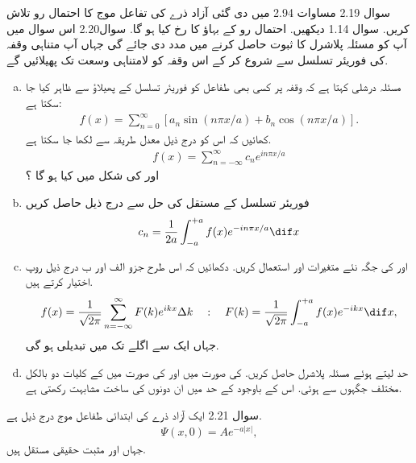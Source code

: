 سوال 2.19
مساوات 2.94 میں دی گئی آزاد ذرے کی تفاعل موج کا احتمال رو  تلاش کریں. سوال 1.14 دیکھیں. احتمال رو کے بہاؤ کا رخ کیا ہو گا. 
سوال2.20
اس سوال میں آپ کو مسئلہ پلاشرل کا ثبوت حاصل کرنے میں مدد دی جائے گی جہاں آپ متناہی وقفہ کی فوریئر تسلسل سے شروع کر کے اس وقفہ کو لامتناہی وسعت تک پھیلائیں گے. 

\begin{enumerate}[a. ]
\item 
مسئلہ درشلی کہتا ہے کہ وقفہ  پر کسی بھی طفاعل   کو فوریئر تسلسل کے پھیلاؤ سے ظاہر کیا جا سکتا ہے:
\begin{align*}
f(x) = \sum_{n=0}^{\infty} [ a_{n}\sin(  n\pi x/a )  + b_{n}\cos(  n\pi x/a )].
\end{align*}
کھائیں کہ اس کو درج ذیل معدل طریقہ سے لکھا جا سکتا ہے.
\begin{align*}
f(x) = \sum_{n=-\infty}^{\infty} c_{n}e^{i n \pi x /a }
\end{align*}
 اور   کی شکل میں  کیا ہو گا ؟
 \item
 فوریئر تسلسل کے مستقل کی حل سے درج ذیل حاصل کریں
\begin{align*}
c_{n} = \frac{1}{2a} \int_{-a}^{+a} f(x)e^{-in\pi x/a} \dif x
\end{align*}
\item
{}  اور   کی جگہ نئے متغیرات   اور   استعمال کریں. دکھائیں کہ اس طرح جزو الف اور ب درج ذیل روپ اختیار کرتے ہیں. 
\begin{align*}
f(x) = \frac{1}{\sqrt{2 \pi }} \sum_{n=-\infty}^{\infty} F(k)e^{ikx} \Delta k  \quad : \quad F(k) = \frac{1}{\sqrt{2\pi}} \int_{-a}^{+a} f(x) e^{-ikx} \dif x,
\end{align*}
جہاں ایک  سے اگلے  تک  میں تبدیلی   ہو گی. 
\item
حد   لیتے ہوئے مسئلہ پلاشرل حاصل کریں.   کی صورت میں  اور   کی صورت میں    کے کلیات دو بالکل مختلف جگہوں سے ہوئی.  اس کے باوجود   کے حد میں ان دونوں کی ساخت مشابہت رکھتی ہے. 
\end{enumerate}
سوال 2.21
ایک آزاد ذرے کی ابتدائی طفاعل موج درج ذیل ہے. 
\begin{align*}
\Psi (x,0) = Ae^{ -a \left| x \right| } ,
\end{align*}
جہاں  اور   مثبت حقیقی مستقل ہیں. 
